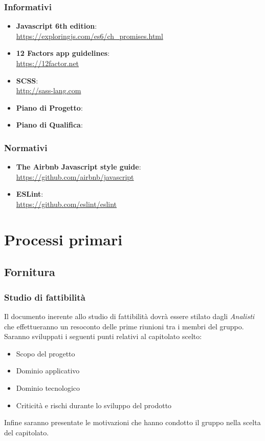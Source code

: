 \subsubsection{Informativi}
\begin{itemize}
\item \textbf{Javascript 6th edition}:\\ \url{https://exploringjs.com/es6/ch\_promises.html}
\item \textbf{12 Factors app guidelines}:\\ \url{https://12factor.net}
\item \textbf{SCSS}: \\ \url{http://sass-lang.com}
\item \textbf{Piano di Progetto}: \\ \pianodiprogetto
\item \textbf{Piano di Qualifica}: \\  \emph{\pianodiqualifica} 
\end{itemize}

\subsubsection{Normativi}
\begin{itemize}
\item \textbf{The Airbnb Javascript style guide}: \\ \url{https://github.com/airbnb/javascript}
\item \textbf{ESLint}: \\ \url{https://github.com/eslint/eslint}
\end{itemize}

\section{Processi primari}

\subsection{Fornitura}

\subsubsection{Studio di fattibilità}

Il documento inerente allo studio di fattibilità dovrà essere stilato
dagli  \emph{Analisti}  che effettueranno un resoconto delle prime riunioni tra
i membri del gruppo. Saranno sviluppati i seguenti punti relativi al
capitolato scelto: 
\begin{itemize}
\item Scopo del progetto
\item Dominio applicativo
\item Dominio tecnologico
\item Criticità e rischi durante lo sviluppo del prodotto
\end{itemize}
Infine saranno presentate le motivazioni che hanno condotto il gruppo
nella scelta del capitolato.

